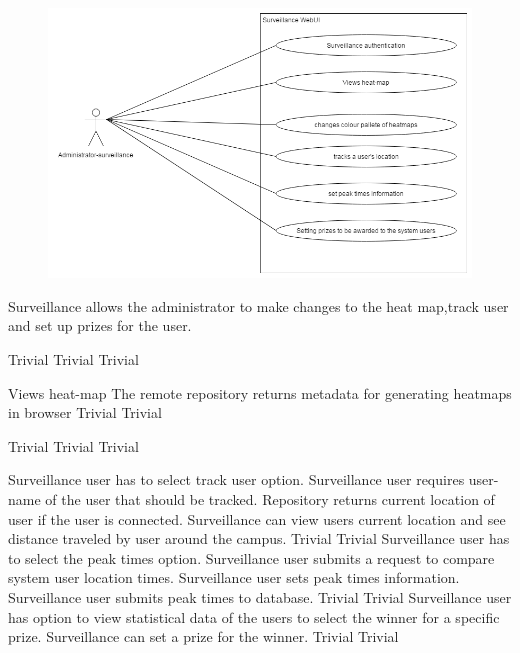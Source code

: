 \begin{figure}[h]
  \includegraphics[width=\textwidth]{diagrams/Specific_Requirements/surveillance_webUI.png}
\end{figure}

Surveillance allows the administrator to make changes to the heat map,track user and set up prizes for the user.

 		{Trivial}
    {Trivial}
    {Trivial}

\FuncReq
    { Views heat-map}
		{The remote repository returns metadata for generating heatmaps in browser}
    {Trivial}
    {Trivial}

		{Trivial}
    {Trivial}
    {Trivial}
	
		{Surveillance user has to select track user option.
		Surveillance user requires user-name of the user that should be tracked.
		Repository returns current location of user if the user is connected.
		Surveillance can view users current location and see distance traveled by user around the campus.}
    {Trivial}
    {Trivial}
		{Surveillance user has to select the peak times option.
		Surveillance user submits a request to compare system user location times.
		Surveillance user sets peak times information.
		Surveillance user submits peak times to database.}
    {Trivial}
    {Trivial}
		{Surveillance user has option to view statistical data of the users to select the winner for a specific prize.
		 Surveillance can set a prize for the winner.}
    {Trivial}
    {Trivial}
